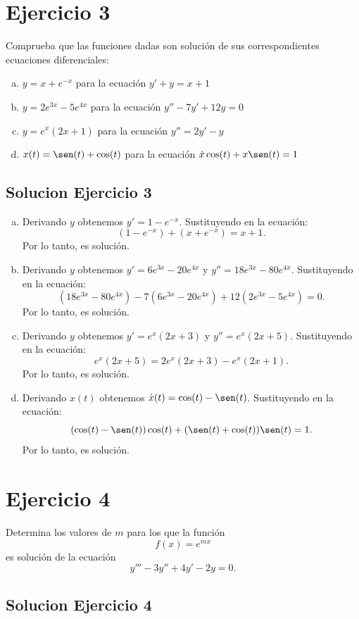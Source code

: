 \documentclass[12pt]{article}
\begin{document}
\section*{Ejercicio 3}

Comprueba que las funciones dadas son solución de sus correspondientes ecuaciones diferenciales:

\begin{enumerate}[a)]
\item $y = x + e^{-x}$ para la ecuación $y' + y = x + 1$
\item $y = 2e^{3x} - 5e^{4x}$ para la ecuación $y'' - 7y' + 12y = 0$
\item $y = e^x(2x + 1)$ para la ecuación $y'' = 2y' - y$
\item $x(t) = \sen(t) + \cos(t)$ para la ecuación $\dot{x}\cos(t) + x\sen(t) = 1$
\end{enumerate}

\subsection*{Solucion Ejercicio 3}
\begin{enumerate}[a)]
\item Derivando $y$ obtenemos $y' = 1 - e^{-x}$. Sustituyendo en la ecuación:
\[(1 - e^{-x}) + (x + e^{-x}) = x + 1.\] 
Por lo tanto, es solución.
\item Derivando $y$ obtenemos $y' = 6e^{3x} - 20e^{4x}$ y $y'' = 18e^{3x} - 80e^{4x}$. Sustituyendo en la ecuación:
\[(18e^{3x} - 80e^{4x}) - 7(6e^{3x} - 20e^{4x}) + 12(2e^{3x} - 5e^{4x}) = 0.\] 
Por lo tanto, es solución.
\item Derivando $y$ obtenemos $y' = e^x(2x + 3)$ y $y'' = e^x(2x + 5)$. Sustituyendo en la ecuación:
\[e^x(2x + 5) = 2e^x(2x + 3) - e^x(2x + 1).\] 
Por lo tanto, es solución.
\item Derivando $x(t)$ obtenemos $\dot{x}(t) = \cos(t) - \sen(t)$. Sustituyendo en la ecuación:
\[(\cos(t) - \sen(t))\cos(t) + (\sen(t) + \cos(t))\sen(t) = 1.\] 
Por lo tanto, es solución.
\end{enumerate}

\section*{Ejercicio 4}

Determina los valores de $m$ para los que la función
\[
f(x) = e^{mx}
\]
es solución de la ecuación
\[
y''' - 3y'' + 4y' - 2y = 0.
\]

\subsection*{Solucion Ejercicio 4}
\end{document}

